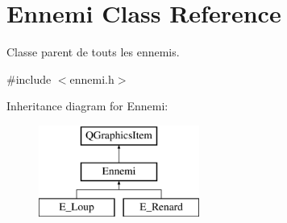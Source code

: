 \hypertarget{class_ennemi}{}\section{Ennemi Class Reference}
\label{class_ennemi}


Classe parent de touts les ennemis.  




{\ttfamily \#include $<$ennemi.\+h$>$}

Inheritance diagram for Ennemi\+:\begin{figure}[H]
\begin{center}
\leavevmode
\includegraphics[height=3.000000cm]{class_ennemi}
\end{center}
\end{figure}
